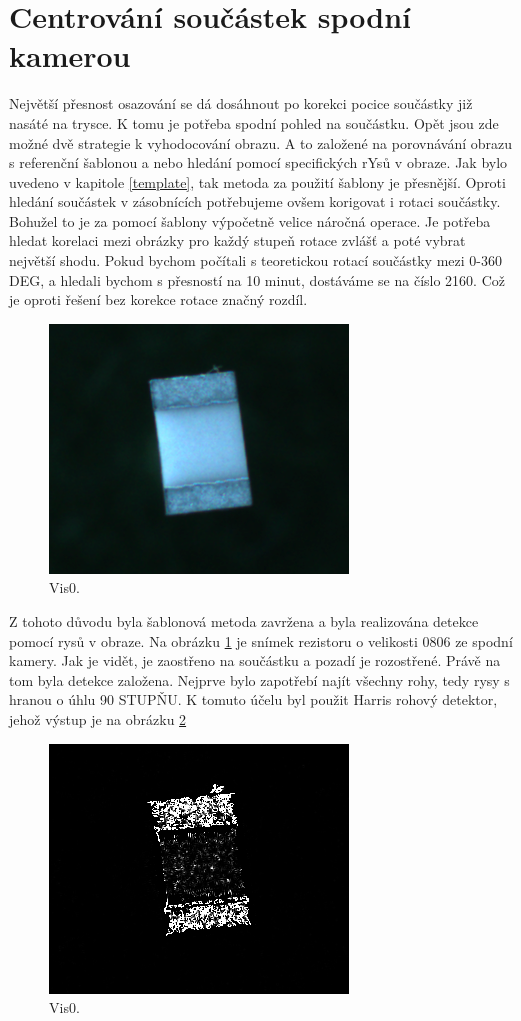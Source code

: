 \section{Centrování součástek spodní kamerou}
Největší přesnost osazování se dá dosáhnout po korekci pocice součástky již nasáté na trysce. K tomu je potřeba spodní pohled na součástku. Opět jsou zde možné dvě strategie k vyhodocování obrazu. A to založené na porovnávání obrazu s referenční šablonou a nebo hledání pomocí specifických rYsů v obraze. Jak bylo uvedeno v kapitole \ref{template}, tak metoda za použití šablony je přesnější. Oproti hledání součástek v zásobnících potřebujeme ovšem korigovat i rotaci součástky. Bohužel to je za pomocí šablony výpočetně velice náročná operace. Je potřeba hledat korelaci mezi obrázky pro každý stupeň rotace zvlášť a poté vybrat největší shodu. Pokud bychom počítali s teoretickou rotací součástky mezi 0-360 DEG, a hledali bychom s přesností na 10 minut, dostáváme se na číslo 2160. Což je oproti řešení bez korekce rotace značný rozdíl.

\begin{figure}[h!]
  \centering
    \includegraphics[width=0.4\linewidth]{obrazky/vis_0.png}%
    \caption{Vis0.}
    \label{fig:vis0}

\end{figure}

Z tohoto důvodu byla šablonová metoda zavržena a byla realizována detekce pomocí rysů v obraze. Na obrázku \ref{fig:vis0} je snímek rezistoru o velikosti 0806 ze spodní kamery. Jak je vidět, je zaostřeno na součástku a pozadí je rozostřené. Právě na tom byla detekce založena. Nejprve bylo zapotřebí  najít všechny rohy, tedy rysy s hranou o úhlu 90 STUPŇU. K tomuto účelu byl použit Harris rohový detektor, jehož výstup je na obrázku \ref{fig:vis1}




\begin{figure}[h!]
  \centering
    \includegraphics[width=0.4\linewidth]{obrazky/vis_1.png}%
    \caption{Vis0.}
    \label{fig:vis1}
\end{figure}

